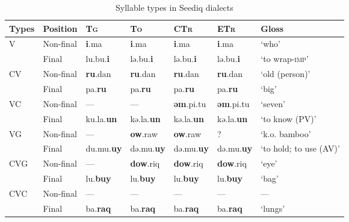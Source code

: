 \documentclass[12pt]{article}
\newcommand{\stg}{\textsc{Tg}\xspace}
\newcommand{\sto}{\textsc{To}\xspace}
\newcommand{\sctr}{\textsc{CTr}\xspace}
\newcommand{\setr}{\textsc{ETr}\xspace}
\begin{document}
\begin{table}[!htbp]
\centering
\caption{Syllable types in Seediq dialects}
\label{tab:dialectsyltype}
\begin{tabular}{lllllll}
\hline
Types        & Position    & \stg    & \sto    & \sctr   & \setr   & Gloss                  \\ \hline
\multirow{2}{*}{V}   & Non-final & \textbf{i}.ma     & \textbf{i}.ma     & \textbf{i}.ma     & \textbf{i}.ma     & `who'                  \\
                     & Final       & lu.bu.\textbf{i}  & lə.bu.\textbf{i}  & lə.bu.\textbf{i}  & lə.bu.\textbf{i}  & `to wrap-\textsc{imp}' \\ \hline
\multirow{2}{*}{CV}  & Non-final & \textbf{ru}.dan   & \textbf{ru}.dan   & \textbf{ru}.dan   & \textbf{ru}.dan   & `old (person)'         \\
                     & Final       & pa.\textbf{ru}    & pa.\textbf{ru}    & pa.\textbf{ru}    & pa.\textbf{ru}    & `big'                  \\ \hline
\multirow{2}{*}{VC}  & Non-final & ---      & ---      & \textbf{əm}.pi.tu   & \textbf{əm}.pi.tu   & `seven'                \\
                     & Final       & ku.la.\textbf{un} & kə.la.\textbf{un} & kə.la.\textbf{un} & kə.la.\textbf{un} & `to know (PV)'         \\ \hline
\multirow{2}{*}{VG}  & Non-final & ---      & \textbf{ow}.raw   & \textbf{ow}.raw   & ?        & `k.o. bamboo'          \\
                     & Final       & du.mu.\textbf{uy} & də.mu.\textbf{uy} & də.mu.\textbf{uy} & də.mu.\textbf{uy} & `to hold; to use (AV)' \\ \hline
\multirow{2}{*}{CVG} & Non-final & ---      & \textbf{dow}.riq  & \textbf{dow}.riq  & \textbf{dow}.riq  & `eye'                  \\
                     & Final       & lu.\textbf{buy}   & lu.\textbf{buy}   & lu.\textbf{buy}   & lu.\textbf{buy}   & `bag'                  \\ \hline
\multirow{2}{*}{CVC} & Non-final & ---      & ---      & ---      & ---      & ---                    \\
                     & Final       & ba.\textbf{raq}   & ba.\textbf{raq}   & ba.\textbf{raq}   & ba.\textbf{raq}   & `lungs'                \\ \hline
\end{tabular}
\end{table}
\end{document}
